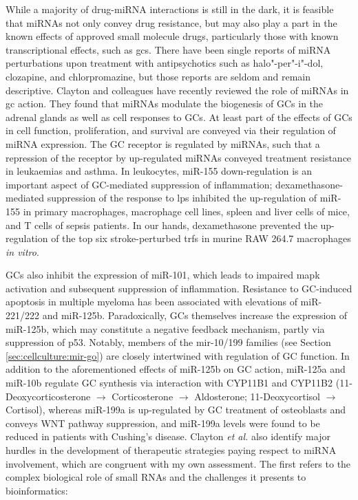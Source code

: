 While a majority of drug-miRNA interactions is still in the dark, it is feasible that miRNAs not only convey drug resistance, but may also play a part in the known effects of approved small molecule drugs, particularly those with known transcriptional effects, such as \acfp{gc}. There have been single reports of miRNA perturbations upon treatment with antipsychotics such as halo"-per"-i"-dol, clozapine, and chlorpromazine, but those reports are seldom and remain descriptive.\cite{Gardiner2014} Clayton and colleagues have recently reviewed the role of miRNAs in \ac{gc} action.\cite{Clayton2018} They found that miRNAs modulate the biogenesis of GCs in the adrenal glands as well as cell responses to GCs. At least part of the effects of GCs in cell function, proliferation, and survival are conveyed via their regulation of miRNA expression. The GC receptor is regulated by miRNAs, such that a repression of the receptor by up-regulated miRNAs conveyed treatment resistance in leukaemias and asthma. In leukocytes, miR-155 down-regulation is an important aspect of GC-mediated suppression of inflammation; dexamethasone-mediated suppression of the response to \acf{lps} inhibited the up-regulation of miR-155 in primary macrophages, macrophage cell lines, spleen and liver cells of mice, and T cells of sepsis patients.\cite{Clayton2018} In our hands, dexamethasone prevented the up-regulation of the top six stroke-perturbed \acfp{trf} in murine RAW 264.7 macrophages \emph{in vitro}.\cite{Winek2020}

GCs also inhibit the expression of miR-101, which leads to impaired \acf{mapk} activation and subsequent suppression of inflammation. Resistance to GC-induced apoptosis in multiple myeloma has been associated with elevations of miR-221/222 and miR-125b. Paradoxically, GCs themselves increase the expression of miR-125b, which may constitute a negative feedback mechanism, partly via suppression of p53.\cite{Murray2013} Notably, members of the mir-10/199 families (see Section \ref{sec:cellculture:mir-go}) are closely intertwined with regulation of GC function. In addition to the aforementioned effects of miR-125b on GC action, miR-125a and miR-10b regulate GC synthesis via interaction with CYP11B1 and CYP11B2 (11-Deoxycorticosterone $\to$ Corticosterone $\to$ Aldosterone; 11-Deoxycortisol $\to$ Cortisol), whereas miR-199a is up-regulated by GC treatment of osteoblasts and conveys WNT pathway suppression, and miR-199a levels were found to be reduced in patients with Cushing's disease. Clayton \emph{et al.}\cite{Clayton2018} also identify major hurdles in the development of therapeutic strategies paying respect to miRNA involvement, which are congruent with my own assessment. The first refers to the complex biological role of small RNAs and the challenges it presents to bioinformatics: 

